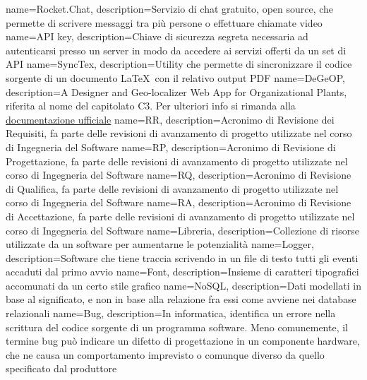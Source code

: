  {
	name=Rocket.Chat,
	description={Servizio di chat gratuito, open source, che permette di scrivere messaggi tra più persone o effettuare chiamate video}
}
 {
	name=API key,
	description={Chiave di sicurezza segreta necessaria ad autenticarsi presso un server in modo da accedere ai servizi offerti da un set di API}
}
 {
	name=SyncTex,
	description={Utility che permette di sincronizzare il codice sorgente di un documento \LaTeX\ con il relativo output PDF}
}
 {
	name=DeGeOP,
	description={A Designer and Geo-localizer Web App for Organizational Plants, riferita al nome del capitolato C3. Per ulteriori info si rimanda alla \href{http://www.math.unipd.it/~tullio/IS-1/2016/Progetto/C3.pdf}{documentazione ufficiale}}
}
 {
	name=RR,
	description={Acronimo di Revisione dei Requisiti, fa parte delle revisioni di avanzamento di progetto utilizzate nel corso di Ingegneria del Software}
}
 {
	name=RP,
	description={Acronimo di Revisione di Progettazione, fa parte delle revisioni di avanzamento di progetto utilizzate nel corso di Ingegneria del Software}
}
 {
	name=RQ,
	description={Acronimo di Revisione di Qualifica, fa parte delle revisioni di avanzamento di progetto utilizzate nel corso di Ingegneria del Software}
}
 {
	name=RA,
	description={Acronimo di Revisione di Accettazione, fa parte delle revisioni di avanzamento di progetto utilizzate nel corso di Ingegneria del Software}
}
 {
	name=Libreria,
	description={Collezione di risorse utilizzate da un software per aumentarne le potenzialità}
}
 {
	name=Logger,
	description={Software che tiene traccia scrivendo in un file di testo tutti gli eventi accaduti dal primo avvio}
}
 {
	name=Font,
	description={Insieme di caratteri tipografici accomunati da un certo stile grafico}
}
 {
	name=NoSQL,
	description={Dati modellati in base al significato, e non in base alla relazione fra essi come avviene nei database relazionali}
}
 {  
  	name=Bug, 
  	description={In informatica, identifica un errore nella scrittura del codice sorgente di un programma software. Meno comunemente, il termine bug può indicare un difetto di progettazione in un componente hardware, che ne causa un comportamento imprevisto o comunque diverso da quello specificato dal produttore}  
}  
